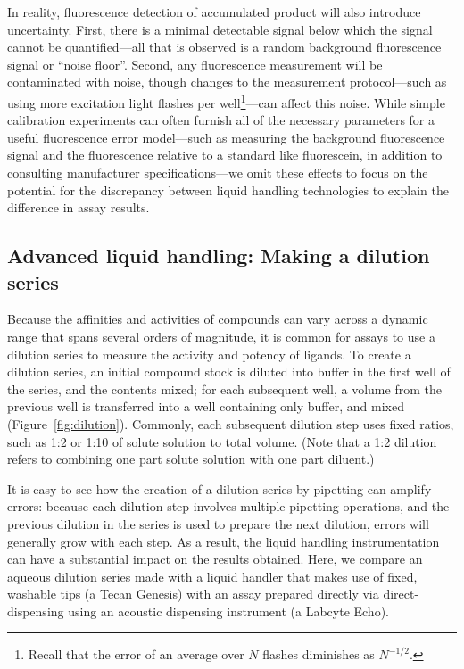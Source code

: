 \documentclass[aps,pre,twocolumn,nofootinbib,superscriptaddress,linenumbers]{revtex4-1}
\begin{document}
In reality, fluorescence detection of accumulated product will also introduce uncertainty.
First, there is a minimal detectable signal below which the signal cannot be quantified---all that is observed is a random background fluorescence signal or ``noise floor''.
Second, any fluorescence measurement will be contaminated with noise, though changes to the measurement protocol---such as using more excitation light flashes per well\footnote{Recall that the error of an average over $N$ flashes diminishes as $N^{-1/2}$.}---can affect this noise.
While simple calibration experiments can often furnish all of the necessary parameters for a useful fluorescence error model---such as measuring the background fluorescence signal and the fluorescence relative to a standard like fluorescein, in addition to consulting manufacturer specifications---we omit these effects to focus on the potential for the discrepancy between liquid handling technologies to explain the difference in assay results.

\subsection*{Advanced liquid handling: Making a dilution series}

Because the affinities and activities of compounds can vary across a dynamic range that spans several orders of magnitude, it is common for assays to use a dilution series to measure the activity and potency of ligands. 
To create a dilution series, an initial compound stock is diluted into buffer in the first well of the series, and the contents mixed; for each subsequent well, a volume from the previous well is transferred into a well containing only buffer, and mixed (Figure~\ref{fig:dilution}).
Commonly, each subsequent dilution step uses fixed ratios, such as 1:2 or 1:10 of solute solution to total volume.
(Note that a 1:2 dilution refers to combining one part solute solution with one part diluent.)

It is easy to see how the creation of a dilution series by pipetting can amplify errors:
because each dilution step involves multiple pipetting operations, and the previous dilution in the series is used to prepare the next dilution, errors will generally grow with each step.
As a result, the liquid handling instrumentation can have a substantial impact on the results obtained.
Here, we compare an aqueous dilution series made with a liquid handler that makes use of fixed, washable tips (a Tecan Genesis) with an assay prepared directly via direct-dispensing using an acoustic dispensing instrument (a Labcyte Echo).
\end{document}

